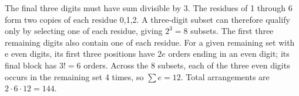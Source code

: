 The final three digits must have sum divisible by 3. The residues of 1 through 6 form two copies of each residue 0,1,2. A three-digit subset can therefore qualify only by selecting one of each residue, giving $2^3=8$ subsets. The first three remaining digits also contain one of each residue. For a given remaining set with e even digits, its first three positions have $2 e$ orders ending in an even digit; its final block has $3!=6$ orders. Across the 8 subsets, each of the three even digits occurs in the remaining set 4 times, so $\sum e=12$. Total arrangements are $2\cdot 6\cdot 12=\boxed{144}$.
